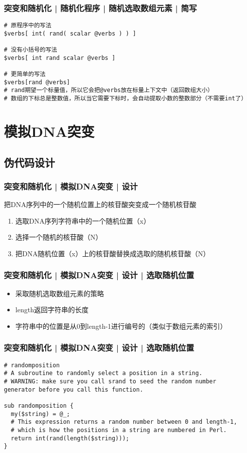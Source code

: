 \begin{frame}[fragile]
  \frametitle{突变和随机化 | 随机化程序 | 随机选取数组元素 | \alert{简写}}
\begin{lstlisting}
# 原程序中的写法
$verbs[ int( rand( scalar @verbs ) ) ] 

# 没有小括号的写法
$verbs[ int rand scalar @verbs ] 

# 更简单的写法
$verbs[rand @verbs]
# rand期望一个标量值，所以它会把@verbs放在标量上下文中（返回数组大小）
# 数组的下标总是整数值，所以当它需要下标时，会自动提取小数的整数部分（不需要int了）
\end{lstlisting}
\end{frame}

\section{模拟DNA突变}
\subsection{伪代码设计}
\begin{frame}
  \frametitle{突变和随机化 | 模拟DNA突变 | 设计}
  \begin{block}{把DNA序列中的一个随机位置上的核苷酸突变成一个随机核苷酸}
    \begin{enumerate}
      \item 选取DNA序列字符串中的一个随机位置（x）
      \item 选择一个随机的核苷酸（N）
      \item 把DNA随机位置（x）上的核苷酸替换成选取的随机核苷酸（N）
    \end{enumerate}
  \end{block}
\end{frame}

\begin{frame}
  \frametitle{突变和随机化 | 模拟DNA突变 | 设计 | \alert{选取随机位置}}
  \begin{itemize}
    \item 采取随机选取数组元素的策略
    \item length返回字符串的长度
    \item 字符串中的位置是从0到length-1进行编号的（类似于数组元素的索引）
  \end{itemize}
\end{frame}

\begin{frame}[fragile]
  \frametitle{突变和随机化 | 模拟DNA突变 | 设计 | 选取随机位置}
\begin{lstlisting}
# randomposition
# A subroutine to randomly select a position in a string.
# WARNING: make sure you call srand to seed the random number generator before you call this function.

sub randomposition {
  my($string) = @_;
  # This expression returns a random number between 0 and length-1,
  # which is how the positions in a string are numbered in Perl.
  return int(rand(length($string)));
}
\end{lstlisting}
\end{frame}

